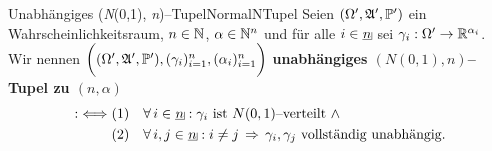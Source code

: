 \begin{definition}{Unabh\"angiges (\textsl N(0,1),
\textsl n)--Tupel}{NormalNTupel}
Seien $(\Omega', \mathfrak{A}', \mathbb{P}')$ ein Wahrscheinlichkeitsraum,
$n \in \mathbb{N}$, $\alpha \in \mathbb{N}^n$ und für alle $i \in \haken n$ sei
$\gamma_i :\Omega' \rightarrow \mathbb{R}^{\alpha_i}$.\\
Wir nennen $\bigg((\Omega', \mathfrak{A}', \mathbb{P}'), (\gamma_i)_{i=1}^n,
(\alpha_i)_{i=1}^n \bigg)$ \textbf{unabhängiges $(N(0,1), n)$--Tupel
zu $(n, \alpha)$}
\begin{align*}
:\iff &(1)\quad\forall\,i\in\haken n:\gamma_i \text{ ist }
N(0,1)\text{--verteilt } \wedge\\
&(2)\quad \forall\,i, j \in \haken n: i \neq j \folgt \gamma_i, \gamma_j 
     \text{ vollständig unabhängig.}
\end{align*}
\end{definition}